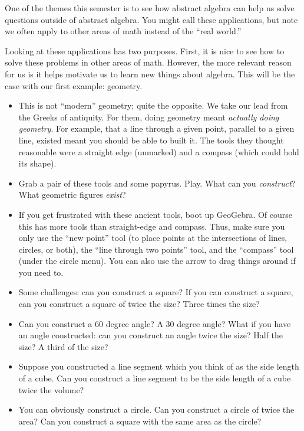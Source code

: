\documentclass[12pt]{article}
\theoremstyle{plain}
\theoremstyle{definition}
\theoremstyle{remark}
\begin{document}
One of the themes this semester is to see how abstract algebra can help us solve questions outside of abstract algebra.  You might call these applications, but note we often apply to other areas of math instead of the ``real world.''

Looking at these applications has two purposes.  First, it is nice to see how to solve these problems in other areas of math.  However, the more relevant reason for us is it helps motivate us to learn new things about algebra.  This will be the case with our first example: geometry.

\begin{itemize}

\item This is not ``modern'' geometry; quite the opposite.  We take our lead from the Greeks of antiquity.  For them, doing geometry meant {\em actually doing geometry}.  For example, that a line through a given point, parallel to a given line, existed meant you should be able to built it.  The tools they thought reasonable were a straight edge (unmarked) and a compass (which could hold its shape).

\item Grab a pair of these tools and some papyrus.  Play.  What can you \emph{construct}?  What geometric figures \emph{exist}?

\item If you get frustrated with these ancient tools, boot up GeoGebra.  Of course this has more tools than straight-edge and compass.  Thus, make sure you only use the ``new point'' tool (to place points at the intersections of lines, circles, or both), the ``line through two points'' tool, and the ``compass'' tool (under the circle menu).  You can also use the arrow to drag things around if you need to.

\item Some challenges: can you construct a square?  If you can construct a square, can you construct a square of twice the size?  Three times the size?

\item Can you construct a 60 degree angle?  A 30 degree angle?  What if you have an angle constructed: can you construct an angle twice the size?  Half the size?  A third of the size?

\item Suppose you constructed a line segment which you think of as the side length of a cube.  Can you construct a line segment to be the side length of a cube twice the volume?

\item You can obviously construct a circle.  Can you construct a circle of twice the area?  Can you construct a square with the same area as the circle?
\end{itemize}
\end{document}
